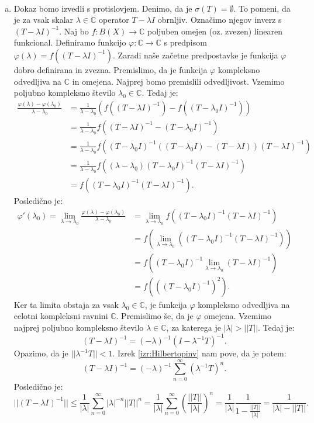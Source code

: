 \documentclass[12pt,a4paper,oneside,fleqn,openany]{book}
\newcommand{\eopf}{\raisebox{0.8ex}{\framebox{}}} %
\newenvironment{dokaz}%
{\noindent{\bf Dokaz.}\ }%
{\hfill\eopf\par\bigskip}%
\newcommand{\C}{\mathbb{C}}
\newcommand{\abs}[1]{\ensuremath{\lvert #1 \rvert}}
\newcommand{\norm}[1]{\abs{\abs{#1}}}
\newcommand{\map}[3]{\ensuremath{{#1}:{#2}\rightarrow{#3}}}
\begin{document}
\begin{dokaz}
\begin{enumerate}[a)]
		\item Dokaz bomo izvedli s protislovjem. Denimo, da je $\sigma(T)=\emptyset$. To pomeni, da je za vsak skalar $\lambda\in\C$ operator $T - \lambda I$ obrnljiv. Označimo njegov inverz s $(T - \lambda I)^{-1}$. Naj bo $\map{f}{B(X)}{\C}$ poljuben omejen (oz. zvezen) linearen funkcional. Definiramo funkcijo $\map{\varphi}{\C}{\C}$ s predpisom $\varphi(\lambda)= f((T-\lambda I)^{-1})$. Zaradi naše začetne predpostavke je funkcija $\varphi$ dobro definirana in zvezna. Premislimo, da je funkcija $\varphi$ kompleksno odvedljiva na $\C$ in omejena.
		Najprej bomo premislili odvedljivost. Vzemimo poljubno kompleksno število $\lambda_0\in\C$. Tedaj je: \begin{align*}
			\frac{\varphi(\lambda)-\varphi(\lambda_0)}{\lambda - \lambda_0} &= \frac{1}{\lambda - \lambda_0}(f((T-\lambda I)^{-1}) - f((T-\lambda_0 I)^{-1})) \\
			&= \frac{1}{\lambda - \lambda_0}f((T-\lambda I)^{-1} - (T-\lambda_0 I)^{-1}) \\
			&= \frac{1}{\lambda - \lambda_0}f((T-\lambda_0 I)^{-1}\left((T-\lambda_0 I) - (T-\lambda I)\right)(T-\lambda I)^{-1}) \\
			&= \frac{1}{\lambda - \lambda_0}f((\lambda - \lambda_0)(T-\lambda_0 I)^{-1}(T-\lambda I)^{-1}) \\
			&= f((T-\lambda_0 I)^{-1}(T-\lambda I)^{-1}).
		\end{align*}
		Posledično je: \begin{align*}
			\varphi'(\lambda_0)=\lim_{\lambda\to \lambda_0}\frac{\varphi(\lambda)-\varphi(\lambda_0)}{\lambda - \lambda_0} &= \lim_{\lambda\to\lambda_0}f((T-\lambda_0 I)^{-1}(T-\lambda I)^{-1}) \\
			&= f(\lim_{\lambda\to \lambda_0}\left((T-\lambda_0 I)^{-1}(T-\lambda I)^{-1}\right)) \\
			&= f((T-\lambda_0 I)^{-1}\lim_{\lambda\to \lambda_0}(T-\lambda I)^{-1}) \\
			&= f(((T-\lambda_0 I)^{-1})^2).
		\end{align*}
		Ker ta limita obstaja za vsak $\lambda_0\in\C$, je funkcija $\varphi$ kompleksno odvedljiva na celotni kompleksni ravnini $\C$. Premislimo še, da je $\varphi$ omejena.
		Vzemimo najprej poljubno kompleksno število $\lambda\in\C$, za katerega je $\abs{\lambda}>\norm{T}$. Tedaj je: $$(T- \lambda I)^{-1} = (-\lambda)^{-1}(I - \lambda^{-1}T)^{-1}.$$ Opazimo, da je $\norm{\lambda^{-1}T}<1$. Izrek \ref{izr:Hilbertopinv} nam pove, da je potem: $$(T- \lambda I)^{-1} = (-\lambda)^{-1}\sum_{n = 0}^{\infty}(\lambda^{-1}T)^n.$$ Posledično je: $$\norm{(T- \lambda I)^{-1}} \leq\frac{1}{\abs{\lambda}}\sum_{n = 0}^{\infty}\abs{\lambda}^{-n}\norm{T}^n = \frac{1}{\abs{\lambda}}\sum_{n=0}^{\infty}\left(\frac{\norm{T}}{\abs{\lambda}}\right)^n = \frac{1}{\abs{\lambda}}\frac{1}{1-\frac{\norm{T}}{\abs{\lambda}}}=\frac{1}{\abs{\lambda}-\norm{T}}.$$

\end{enumerate}
\end{dokaz}
\end{document}
